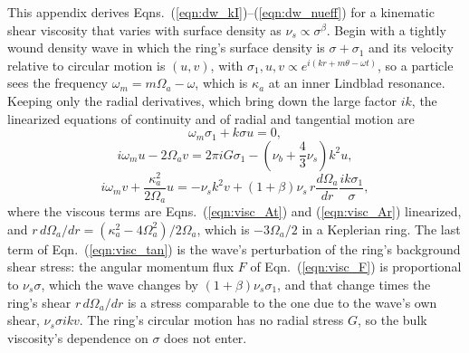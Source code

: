 \documentclass[twocolumn]{aastex702}
\begin{document}
This appendix derives Eqns.\ (\ref{eqn:dw_kI})--(\ref{eqn:dw_nueff}) for a kinematic shear viscosity that varies
with surface density as $\nu_s \propto \sigma^\beta$. Begin with a tightly wound density wave in which the ring's
surface density is $\sigma + \sigma_1$ and its velocity relative to circular motion is $(u, v)$, with
$\sigma_1, u, v \propto e^{i(kr + m\theta - \omega t)}$, so a particle sees the frequency
$\omega_m = m\Omega_a - \omega$, which is $\kappa_a$ at an inner Lindblad resonance. Keeping only the radial
derivatives, which bring down the large factor $ik$, the linearized equations of continuity and of radial and
tangential motion are
\begin{equation}
    \label{eqn:visc_cont}
    \omega_m\sigma_1 + k\sigma u = 0,
\end{equation}
\begin{equation}
    \label{eqn:visc_rad}
    i\omega_mu - 2\Omega_av = 2\pi iG\sigma_1 - \left(\nu_b + \frac{4}{3}\nu_s\right)k^2u,
\end{equation}
\begin{equation}
    \label{eqn:visc_tan}
    i\omega_mv + \frac{\kappa_a^2}{2\Omega_a}u = -\nu_sk^2v + (1 + \beta)\nu_s\,r\frac{d\Omega_a}{dr}\frac{ik\sigma_1}{\sigma},
\end{equation}
where the viscous terms are Eqns.\ (\ref{eqn:visc_At}) and (\ref{eqn:visc_Ar}) linearized, and
$r\,d\Omega_a/dr = (\kappa_a^2 - 4\Omega_a^2)/2\Omega_a$, which is $-3\Omega_a/2$ in a Keplerian ring. The last term
of Eqn.\ (\ref{eqn:visc_tan}) is the wave's perturbation of the ring's background shear stress: the angular momentum
flux $F$ of Eqn.\ (\ref{eqn:visc_F}) is proportional to $\nu_s\sigma$, which the wave changes by
$(1 + \beta)\nu_s\sigma_1$, and that change times the ring's shear $r\,d\Omega_a/dr$ is a stress comparable to the
one due to the wave's own shear, $\nu_s\sigma ikv$. The ring's circular motion
has no radial stress $G$, so the bulk viscosity's dependence on $\sigma$ does not enter.
\end{document}

